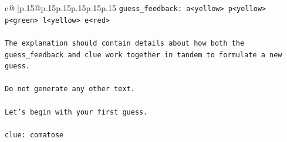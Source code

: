 \documentclass{article}
\begin{document}
{\begin{supertabular}{c@{$\;$}|p{.15\linewidth}@{}p{.15\linewidth}p{.15\linewidth}p{.15\linewidth}p{.15\linewidth}p{.15\linewidth}}
{{{\texttt{guess\_feedback: a<yellow> p<yellow> p<green> l<yellow> e<red>} \\
\\ 
\texttt{The explanation should contain details about how both the guess\_feedback and clue work together in tandem to formulate a new guess.} \\
\\ 
\texttt{Do not generate any other text.} \\
\\ 
\texttt{Let's begin with your first guess.} \\
\\ 
\texttt{clue: comatose} \\
            }
        }
    }
     \\ \\


\end{supertabular}}
\end{document}
